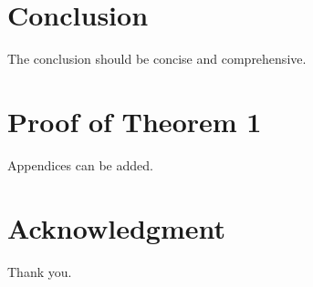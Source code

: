 \documentclass[11pt,oneside,openany]{book}
\begin{document}

\chapter{Conclusion}
The conclusion should be concise and comprehensive.


\appendix
\chapter{Proof of Theorem 1}
Appendices can be added.


\backmatter
\chapter{Acknowledgment}
Thank you.




\end{document}
